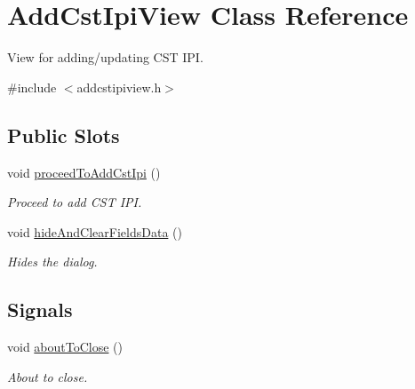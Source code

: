 \hypertarget{class_add_cst_ipi_view}{\section{\-Add\-Cst\-Ipi\-View \-Class \-Reference}
\label{class_add_cst_ipi_view}
}


\-View for adding/updating \-C\-S\-T \-I\-P\-I.  




{\ttfamily \#include $<$addcstipiview.\-h$>$}

\subsection*{\-Public \-Slots}
\begin{DoxyCompactItemize}
\item 
void \hyperlink{class_add_cst_ipi_view_a70ec517e4218610bd9bab5d1c624e183}{proceed\-To\-Add\-Cst\-Ipi} ()
\begin{DoxyCompactList}\small\item\em \-Proceed to add \-C\-S\-T \-I\-P\-I. \end{DoxyCompactList}\item 
void \hyperlink{class_add_cst_ipi_view_ace30b1d55aac8290ddacb5f6fb2c566e}{hide\-And\-Clear\-Fields\-Data} ()
\begin{DoxyCompactList}\small\item\em \-Hides the dialog. \end{DoxyCompactList}\end{DoxyCompactItemize}
\subsection*{\-Signals}
\begin{DoxyCompactItemize}
\item 
void \hyperlink{class_add_cst_ipi_view_a32b39c2e1da1b1fe4ce8ff629d9f4ad8}{about\-To\-Close} ()
\begin{DoxyCompactList}\small\item\em \-About to close. \end{DoxyCompactList}\end{DoxyCompactItemize}
